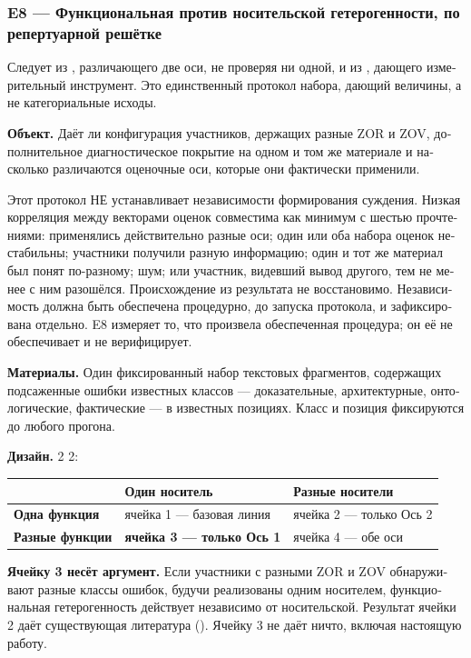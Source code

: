 \begin{russian}
\subsubsection*{E8 — Функциональная против носительской гетерогенности, по репертуарной решётке}
\label{sec:ru:x-e8}

Следует из , различающего две оси, не проверяя ни одной, и из , дающего измерительный инструмент. Это единственный протокол набора, дающий величины, а не категориальные исходы.

\textbf{Объект.} Даёт ли конфигурация участников, держащих разные ZOR и ZOV, дополнительное диагностическое покрытие на одном и том же материале и насколько различаются оценочные оси, которые они фактически применили.

Этот протокол НЕ устанавливает независимости формирования суждения. Низкая корреляция между векторами оценок совместима как минимум с шестью прочтениями: применялись действительно разные оси; один или оба набора оценок нестабильны; участники получили разную информацию; один и тот же материал был понят по-разному; шум; или участник, видевший вывод другого, тем не менее с ним разошёлся. Происхождение из результата не восстановимо. Независимость должна быть обеспечена процедурно, до запуска протокола, и зафиксирована отдельно. E8 измеряет то, что произвела обеспеченная процедура; он её не обеспечивает и не верифицирует.

\textbf{Материалы.} Один фиксированный набор текстовых фрагментов, содержащих подсаженные ошибки известных классов — доказательные, архитектурные, онтологические, фактические — в известных позициях. Класс и позиция фиксируются до любого прогона.

\textbf{Дизайн.} 2 \gtimes{} 2:

\begin{center}
\small
\begin{tabularx}{\linewidth}{>{\raggedright\arraybackslash}X>{\raggedright\arraybackslash}X>{\raggedright\arraybackslash}X}
\toprule
 & \textbf{Один носитель} & \textbf{Разные носители} \\
\midrule
\textbf{Одна функция} & ячейка 1 — базовая линия & ячейка 2 — только Ось 2 \\
\textbf{Разные функции} & \textbf{ячейка 3 — только Ось 1} & ячейка 4 — обе оси \\
\bottomrule
\end{tabularx}
\end{center}
\textbf{Ячейку 3 несёт аргумент.} Если участники с разными ZOR и ZOV обнаруживают разные классы ошибок, будучи реализованы одним носителем, функциональная гетерогенность действует независимо от носительской. Результат ячейки 2 даёт существующая литература (). Ячейку 3 не даёт ничто, включая настоящую работу.


\end{russian}
